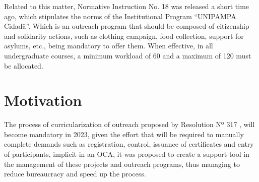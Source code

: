 Related to this matter, Normative Instruction No. 18 \cite{unipampacidada} was released a short time ago, which stipulates the norms of the Institutional Program ``UNIPAMPA Cidadã''. 
Which is an outreach program that should be composed of citizenship and solidarity actions, such as clothing campaign, food collection, support for asylums, etc., being mandatory to offer them. 
When effective, in all undergraduate courses, a minimum workload of 60 and a maximum of 120 must be allocated.

\section{Motivation}\label{sec:motivation}

The process of curricularization of outreach proposed by Resolution Nº 317 \cite{res317}, will become mandatory in 2023, given the effort that will be required to manually complete demands such as registration, control, issuance of certificates and entry of participants, implicit in an \ac{OCA}, it was proposed to create a support tool in the management of these projects and outreach programs, thus managing to reduce bureaucracy and speed up the process.



